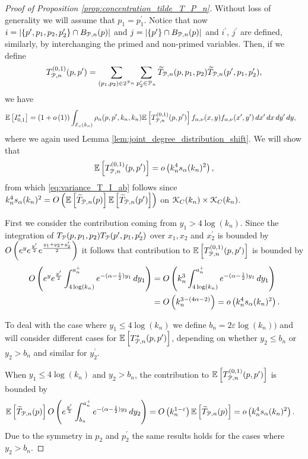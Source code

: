 \begin{proof}[Proof of Proposition \ref{prop:concentration_tilde_T_P_n}]
Without loss of generality we will assume that $p_1 = p_1^\prime$. Notice that now $i = |\{p^\prime, p_1, p_2, p_2^\prime\} \cap B_{{\mathcal P},n}(p)|$ and $j = |\{p^\prime\} \cap B_{{\mathcal P},n}(p)|$ and $i^\prime$, $j^\prime$ are defined, similarly, by interchanging the primed and non-primed variables. Then, if we define
\[
	T^{(0,1)}_{{\mathcal P},n}(p,p^\prime) = \sum_{(p_1,p_2) \in 2^{{\mathcal P}_n}} \sum_{p_2^\prime \in {\mathcal P}_n} \widetilde{T}_{{\mathcal P},n}(p,p_1,p_2) \widetilde{T}_{{\mathcal P},n}(p^\prime,p_1,p_2^\prime),
\]
we have
\begin{align*}
	\mathbb{E}\left[I_{0,1}^\ast\right] &= (1+o\left(1\right))\int_{\mathcal{E}_{\varepsilon}(k_n)} \rho_n(p,p^\prime,k_n,k_n)
			\mathbb{E}\left[T^{(0,1)}_{{\mathcal P},n}(p,p^\prime)\right] f_{\alpha,\nu}(x,y)
			f_{\alpha,\nu}(x^\prime,y^\prime) \, dx^\prime \, dx \, dy^\prime \, dy,
\end{align*} 
where we again used Lemma  \ref{lem:joint_degree_distribution_shift}.
We will show that 
\[
	\mathbb{E}\left[T^{(0,1)}_{{\mathcal P},n}(p,p^\prime)\right] = o\left(k_n^4 s_\alpha(k_n)^2\right),
\] 
from which \eqref{eq:variance_T_I_ab} follows since $k_n^4 s_\alpha(k_n)^2 = O\left(\mathbb{E}\left[\widetilde{T}_{{\mathcal P},n}(p)\right] \mathbb{E}\left[\widetilde{T}_{{\mathcal P},n}(p^\prime)\right]\right)$ on ${\mathcal K}_{C}(k_n) \times {\mathcal K}_{C}(k_n)$.

First we consider the contribution coming from $y_1 > 4 \log(k_n)$. Since the integration of $T_{{\mathcal P}}(p,p_1,p_2) T_{{\mathcal P}}(p^\prime,p_1,p_2^\prime)$ over $x_1, x_2$ and $x_2^\prime$ is bounded by $O\left(e^{y}e^{\frac{y^\prime}{2}} e^{\frac{y_1 + y_2 + y_2^\prime}{2}}\right)$ it follows that contribution to $\mathbb{E}\left[T^{(0,1)}_{{\mathcal P},n}(p,p^\prime)\right]$ is bounded by
\begin{align*}
	O\left(e^{y}e^{\frac{y^\prime}{2}} \int_{4\log(k_n)}^{a_n^+} e^{-(\alpha - \frac{1}{2})y_1} \, dy_1\right)
	&= O\left(k_n^3 \int_{4\log(k_n)}^{a_n^+} e^{-(\alpha - \frac{1}{2})y_1} \, dy_1\right)\\
	&= O\left(k_n^{3 - (4\alpha - 2)}\right) = o\left(k_n^4 s_\alpha(k_n)^2\right).
\end{align*}

To deal with the case where $y_1 \le 4\log(k_n)$ we define $b_n = 2\varepsilon\log(k_n))$ and will consider different cases for $\mathbb{E}\left[T^\ast_{{\mathcal P},n}(p,p^\prime)\right]$, depending on whether $y_2 \le b_n$ or $y_2 > b_n$ and similar for $y_2^\prime$. 

When $y_1 \le 4\log(k_n)$ and $y_2 > b_n$, the contribution to $\mathbb{E}\left[T^{(0,1)}_{{\mathcal P},n}(p,p^\prime)\right]$ is bounded by
\begin{align*}
	\mathbb{E}\left[\widetilde{T}_{{\mathcal P},n}(p)\right]
		O\left(e^{\frac{y^\prime}{2}}\int_{b_n}^{a_n^+} e^{-(\alpha -\frac{1}{2})y_2} \, dy_2\right)
	&= O\left(k_n^{1 - \varepsilon}\right)\mathbb{E}\left[\widetilde{T}_{{\mathcal P},n}(p)\right]
	= o\left(k_n^4 s_\alpha(k_n)^2\right).
\end{align*}
Due to the symmetry in $p_2$ and $p_2^\prime$ the same results holds for the cases where $y_2 > b_n$.


\end{proof}
